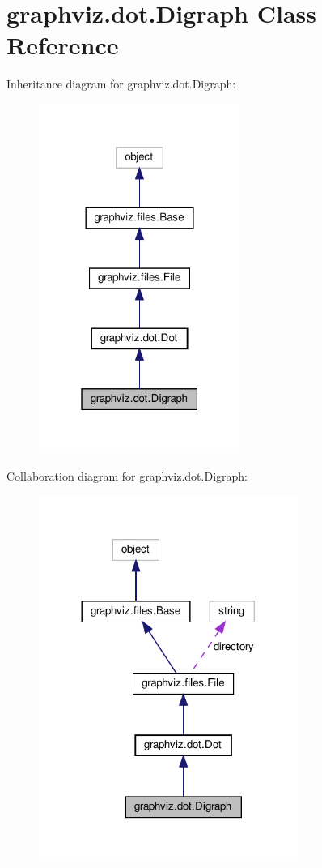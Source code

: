\hypertarget{classgraphviz_1_1dot_1_1Digraph}{}\section{graphviz.\+dot.\+Digraph Class Reference}
\label{classgraphviz_1_1dot_1_1Digraph}


Inheritance diagram for graphviz.\+dot.\+Digraph\+:
\nopagebreak
\begin{figure}[H]
\begin{center}
\leavevmode
\includegraphics[width=187pt]{classgraphviz_1_1dot_1_1Digraph__inherit__graph}
\end{center}
\end{figure}


Collaboration diagram for graphviz.\+dot.\+Digraph\+:
\nopagebreak
\begin{figure}[H]
\begin{center}
\leavevmode
\includegraphics[width=240pt]{classgraphviz_1_1dot_1_1Digraph__coll__graph}
\end{center}
\end{figure}
